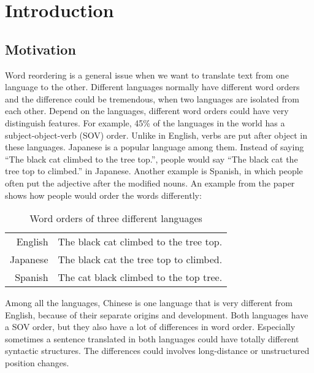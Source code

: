 
\chapter{Introduction}
\label{ch:Introduction}

\section{Motivation}
\label{ch:Introduction:sec:Motivation}

Word reordering is a general issue when we want to translate text from one language to the other. Different languages normally have different word orders and the difference could be tremendous, when two languages are isolated from each other. Depend on the languages, different word orders could have very distinguish features. For example, 45\% of the languages in the world has a subject-object-verb (SOV) order. Unlike in English, verbs are put after object in these languages. Japanese is a popular language among them. Instead of saying ``The black cat climbed to the tree top.'', people would say ``The black cat the tree top to climbed.'' in Japanese. Another example is Spanish, in which people often put the adjective after the modified nouns. An example from the paper \cite{google} shows how people would order the words differently:

\begin{table}[H]
\centering
\begin{tabular}{| r l |}
\hline 
English & The black cat climbed to the tree top. \Hstrut \Tstrut \\
\Hstrut Japanese & The black cat the tree top to climbed. \\
Spanish & The cat black climbed to the top tree. \Bstrut \\
\hline
\end{tabular}
\caption{Word orders of three different languages}
\end{table}

Among all the languages, Chinese is one language that is very different from English, because of their separate origins and development. Both languages have a SOV order, but they also have a lot of differences in word order. Especially sometimes a sentence translated in both languages could have totally different syntactic structures. The differences could involves long-distance or unstructured position changes.

